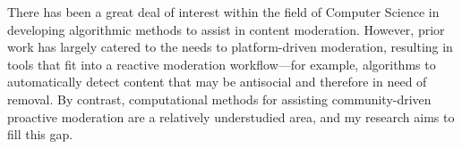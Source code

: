 \documentclass[11pt,letterpaper]{article}
\begin{document}
There has been a great deal of interest within the field of Computer Science in developing algorithmic methods to assist in content moderation.
However, prior work has largely catered to the needs to platform-driven moderation, resulting in tools that fit into a reactive moderation workflow---for example, algorithms to automatically detect content that may be antisocial and therefore in need of removal.
By contrast, computational methods for assisting community-driven proactive moderation are a relatively understudied area, and my research aims to fill this gap.




\end{document}
